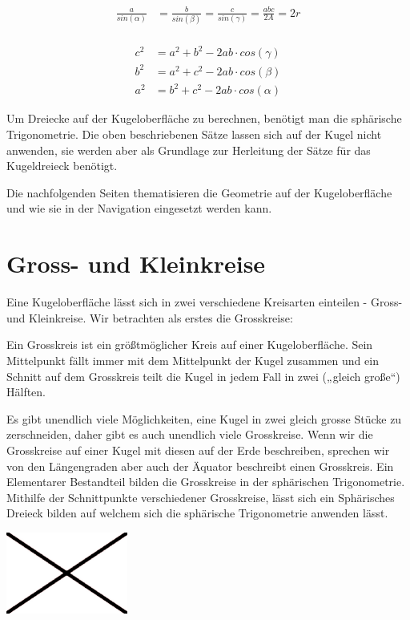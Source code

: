 \begin{refsection}
\begin{align*}
\frac{ a }{ sin(\alpha) } &= \frac{ b }{sin(\beta)} = \frac{ c }{ sin(\gamma) } = \frac{abc}{2A} = 2r\\
\end{align*}

\begin{align*}
c^{ 2 } &= a^{ 2 } + b^{ 2 } - 2ab\cdot cos(\gamma)\\
b^{ 2 } &= a^{ 2 } + c^{ 2 } - 2ab\cdot cos(\beta)\\
a^{ 2 } &= b^{ 2 } + c^{ 2 } - 2ab\cdot cos(\alpha)
\end{align*}

Um Dreiecke auf der Kugeloberfläche zu berechnen, benötigt man die sphärische Trigonometrie. Die oben beschriebenen Sätze lassen sich auf der Kugel nicht anwenden, sie werden aber als Grundlage zur Herleitung der Sätze für das Kugeldreieck benötigt.

Die nachfolgenden Seiten thematisieren die Geometrie auf der Kugeloberfläche und wie sie in der Navigation eingesetzt werden kann.


\section{Gross- und Kleinkreise}

Eine Kugeloberfläche lässt sich in zwei verschiedene Kreisarten einteilen -  Gross- und Kleinkreise. 
Wir betrachten als erstes die Grosskreise:

\begin{definition}
Ein Grosskreis ist ein größtmöglicher Kreis auf einer Kugeloberfläche. Sein Mittelpunkt fällt immer mit dem Mittelpunkt der Kugel zusammen und ein Schnitt auf dem Grosskreis teilt die Kugel in jedem Fall in zwei („gleich große“) Hälften.
\end{definition}

Es gibt unendlich viele Möglichkeiten, eine Kugel in zwei gleich grosse Stücke zu zerschneiden, 
daher gibt es auch unendlich viele Grosskreise. Wenn wir die Grosskreise auf einer Kugel mit diesen auf der Erde beschreiben, sprechen wir von den Längengraden aber auch der Äquator beschreibt einen Grosskreis.
Ein Elementarer Bestandteil bilden die Grosskreise in der sphärischen Trigonometrie. Mithilfe der Schnittpunkte verschiedener Grosskreise, lässt sich ein Sphärisches Dreieck bilden auf welchem sich die sphärische Trigonometrie anwenden lässt.

\begin{center}
        \includegraphics[width=0.3\textwidth]{kugel/Beispielbild.jpg}
\end{center}


\end{refsection}
